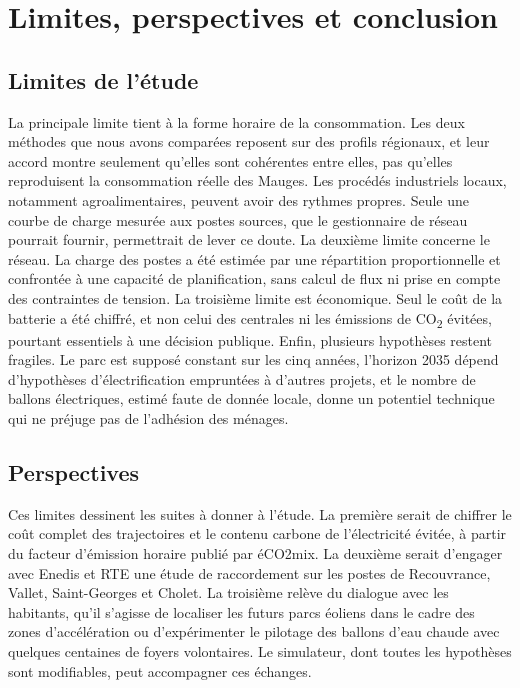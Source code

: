 \chapter[Discussion et conclusion]{Limites, perspectives et conclusion}
\label{chap:discussion}

\section{Limites de l'étude}

La principale limite tient à la forme horaire de la consommation. Les deux méthodes que nous avons comparées reposent sur des profils régionaux, et leur accord montre seulement qu'elles sont cohérentes entre elles, pas qu'elles reproduisent la consommation réelle des Mauges. Les procédés industriels locaux, notamment agroalimentaires, peuvent avoir des rythmes propres. Seule une courbe de charge mesurée aux postes sources, que le gestionnaire de réseau pourrait fournir, permettrait de lever ce doute. La deuxième limite concerne le réseau. La charge des postes a été estimée par une répartition proportionnelle et confrontée à une capacité de planification, sans calcul de flux ni prise en compte des contraintes de tension. La troisième limite est économique. Seul le coût de la batterie a été chiffré, et non celui des centrales ni les émissions de CO\textsubscript{2} évitées, pourtant essentiels à une décision publique. Enfin, plusieurs hypothèses restent fragiles. Le parc est supposé constant sur les cinq années, l'horizon 2035 dépend d'hypothèses d'électrification empruntées à d'autres projets, et le nombre de ballons électriques, estimé faute de donnée locale, donne un potentiel technique qui ne préjuge pas de l'adhésion des ménages.

\section{Perspectives}

Ces limites dessinent les suites à donner à l'étude. La première serait de chiffrer le coût complet des trajectoires et le contenu carbone de l'électricité évitée, à partir du facteur d'émission horaire publié par éCO2mix. La deuxième serait d'engager avec Enedis et RTE une étude de raccordement sur les postes de Recouvrance, Vallet, Saint-Georges et Cholet. La troisième relève du dialogue avec les habitants, qu'il s'agisse de localiser les futurs parcs éoliens dans le cadre des zones d'accélération ou d'expérimenter le pilotage des ballons d'eau chaude avec quelques centaines de foyers volontaires. Le simulateur, dont toutes les hypothèses sont modifiables, peut accompagner ces échanges.

